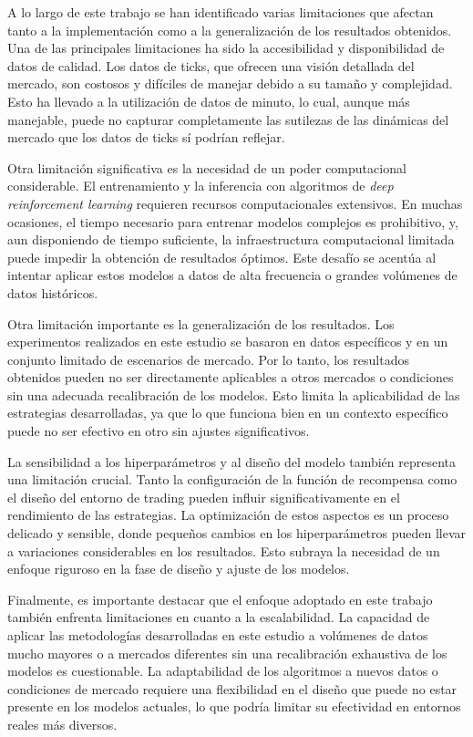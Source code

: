 \documentclass[a4paper,12pt, twoside]{report}
\begin{document}
A lo largo de este trabajo se han identificado varias limitaciones que afectan tanto a 
la implementación como a la generalización de los resultados obtenidos. Una de las 
principales limitaciones ha sido la accesibilidad y disponibilidad de datos de calidad. 
Los datos de ticks, que ofrecen una visión detallada del mercado, son costosos y difíciles 
de manejar debido a su tamaño y complejidad. Esto ha llevado a la utilización de datos de
 minuto, lo cual, aunque más manejable, puede no capturar completamente las sutilezas de 
 las dinámicas del mercado que los datos de ticks sí podrían reflejar.

Otra limitación significativa es la necesidad de un poder computacional considerable. El 
entrenamiento y la inferencia con algoritmos de \textit{deep reinforcement learning} 
requieren recursos computacionales extensivos. En muchas ocasiones, el tiempo necesario 
para entrenar modelos complejos es prohibitivo, y, aun disponiendo de tiempo suficiente, 
la infraestructura computacional limitada puede impedir la obtención de resultados óptimos. 
Este desafío se acentúa al intentar aplicar estos modelos a datos de alta frecuencia o 
grandes volúmenes de datos históricos.

Otra limitación importante es la generalización de los resultados. Los experimentos 
realizados en este estudio se basaron en datos específicos y en un conjunto limitado de 
escenarios de mercado. Por lo tanto, los resultados obtenidos pueden no ser directamente 
aplicables a otros mercados o condiciones sin una adecuada recalibración de los modelos. 
Esto limita la aplicabilidad de las estrategias desarrolladas, ya que lo que funciona bien 
en un contexto específico puede no ser efectivo en otro sin ajustes significativos.

La sensibilidad a los hiperparámetros y al diseño del modelo también representa una 
limitación crucial. Tanto la configuración de la función de recompensa como el diseño
 del entorno de trading pueden influir significativamente en el rendimiento de las 
 estrategias. La optimización de estos aspectos es un proceso delicado y sensible, 
 donde pequeños cambios en los hiperparámetros pueden llevar a variaciones considerables 
 en los resultados. Esto subraya la necesidad de un enfoque riguroso en la fase de diseño
  y ajuste de los modelos.

Finalmente, es importante destacar que el enfoque adoptado en este trabajo también enfrenta 
limitaciones en cuanto a la escalabilidad. La capacidad de aplicar las metodologías 
desarrolladas en este estudio a volúmenes de datos mucho mayores o a mercados diferentes 
sin una recalibración exhaustiva de los modelos es cuestionable. La adaptabilidad de los 
algoritmos a nuevos datos o condiciones de mercado requiere una flexibilidad en el diseño 
que puede no estar presente en los modelos actuales, lo que podría limitar su efectividad 
en entornos reales más diversos.
\end{document}
